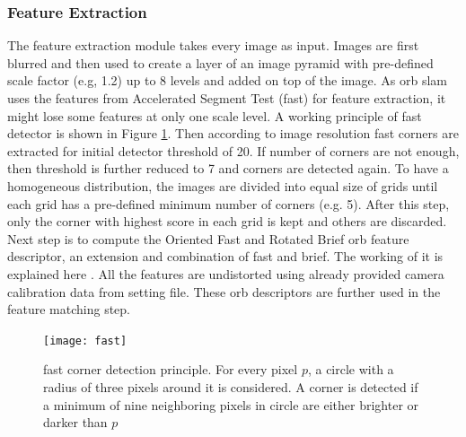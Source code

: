 \subsubsection{Feature Extraction}
The feature extraction module takes every image as input. Images are first blurred and then used to create a layer of an image pyramid with pre-defined scale factor (e.g, 1.2) up to 8 levels and added on top of the image. As \acrshort{orb} \acrshort{slam} uses the features from Accelerated Segment Test (\acrshort{fast}) for feature extraction, it might lose some features at only one scale level. A working principle of \acrshort{fast} detector is shown in Figure \ref{fig:fast}. Then according to image resolution \acrshort{fast} corners are extracted for initial detector threshold of 20. If number of corners are not enough, then threshold is further reduced to 7 and corners are detected again. To have a homogeneous distribution, the images are divided into equal size of grids until each grid has a pre-defined minimum number of corners (e.g. 5). After this step, only the corner with highest score in each grid is kept and others are discarded. \\
\linebreak
Next step is to compute the Oriented Fast and Rotated Brief \acrshort{orb} feature descriptor, an extension and combination of \acrshort{fast} and \acrshort{brief}. The working of it is explained here \cite{ORB}. All the features are undistorted using already provided camera calibration data from setting file. These \acrshort{orb} descriptors are further used in the feature matching step.
\begin{figure}[h]
	\centering
	\texttt{[image: fast]}
	\caption{\acrshort{fast} corner detection principle. For every pixel $p$, a circle with
		a radius of three pixels around it is considered. A corner is detected if a minimum of nine neighboring pixels in circle are either brighter or darker than $ p $ \cite{fast}}
	\label{fig:fast}
\end{figure}

